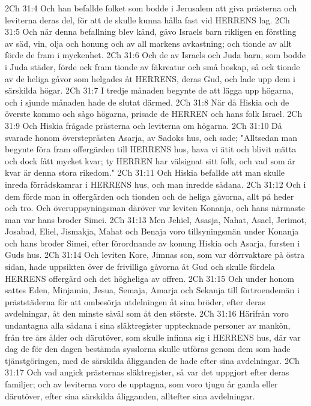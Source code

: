 2Ch 31:4  Och han befallde folket som bodde i Jerusalem att giva prästerna och leviterna deras del, för att de skulle kunna hålla fast vid HERRENS lag.
2Ch 31:5  Och när denna befallning blev känd, gåvo Israels barn rikligen en förstling av säd, vin, olja och honung och av all markens avkastning; och tionde av allt förde de fram i myckenhet.
2Ch 31:6  Och de av Israels och Juda barn, som bodde i Juda städer, förde ock fram tionde av fäkreatur och små boskap, så ock tionde av de heliga gåvor som helgades åt HERRENS, deras Gud, och lade upp dem i särskilda högar.
2Ch 31:7  I tredje månaden begynte de att lägga upp högarna, och i sjunde månaden hade de slutat därmed.
2Ch 31:8  När då Hiskia och de överste kommo och sågo högarna, prisade de HERREN och hans folk Israel.
2Ch 31:9  Och Hiskia frågade prästerna och leviterna om högarna.
2Ch 31:10  Då svarade honom översteprästen Asarja, av Sadoks hus, och sade; "Alltsedan man begynte föra fram offergärden till HERRENS hus, hava vi ätit och blivit mätta och dock fått mycket kvar; ty HERREN har välsignat sitt folk, och vad som är kvar är denna stora rikedom."
2Ch 31:11  Och Hiskia befallde att man skulle inreda förrådskamrar i HERRENS hus, och man inredde sådana.
2Ch 31:12  Och i dem förde man in offergärden och tionden och de heliga gåvorna, allt på heder och tro. Och överuppsyningsman däröver var leviten Konanja, och hans närmaste man var hans broder Simei.
2Ch 31:13  Men Jehiel, Asasja, Nahat, Asael, Jerimot, Josabad, Eliel, Jismakja, Mahat och Benaja voro tillsyningsmän under Konanja och hans broder Simei, efter förordnande av konung Hiskia och Asarja, fursten i Guds hus.
2Ch 31:14  Och leviten Kore, Jimnas son, som var dörrvaktare på östra sidan, hade uppsikten över de frivilliga gåvorna åt Gud och skulle fördela HERRENS offergärd och det högheliga av offren.
2Ch 31:15  Och under honom sattes Eden, Minjamin, Jesua, Semaja, Amarja och Sekanja till förtroendemän i präststäderna för att ombesörja utdelningen åt sina bröder, efter deras avdelningar, åt den minste såväl som åt den störste.
2Ch 31:16  Härifrån voro undantagna alla sådana i sina släktregister upptecknade personer av mankön, från tre års ålder och därutöver, som skulle infinna sig i HERRENS hus, där var dag de för den dagen bestämda sysslorna skulle utföras genom dem som hade tjänstgöringen, med de särskilda åligganden de hade efter sina avdelningar.
2Ch 31:17  Och vad angick prästernas släktregister, så var det uppgjort efter deras familjer; och av leviterna voro de upptagna, som voro tjugu år gamla eller därutöver, efter sina särskilda åligganden, alltefter sina avdelningar.
